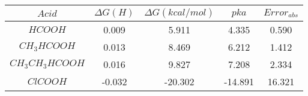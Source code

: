 \begin{tabular}{|c|c|c|c|c|}
    \hline
    $Acid$          & $\Delta G (H)$ & $\Delta G (kcal/mol)$ & $pka$   & $Error_{abs}$ \\ \hline
    $HCOOH$         & 0.009          & 5.911                 & 4.335   & 0.590       \\ \hline
    $CH_3HCOOH$     & 0.013          & 8.469                 & 6.212   & 1.412       \\ \hline
    $CH_3CH_3HCOOH$ & 0.016          & 9.827                 & 7.208   & 2.334       \\ \hline
    $ClCOOH$        & -0.032         & -20.302               & -14.891 & 16.321      \\ \hline
\end{tabular}